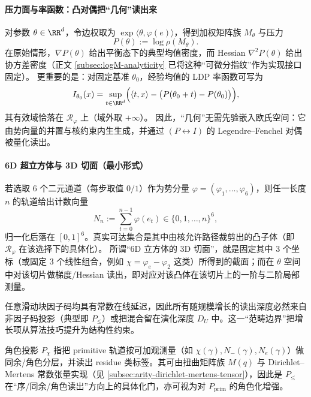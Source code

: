 \paragraph{压力面与率函数：凸对偶把“几何”读出来}
对参数 \(\theta\in\RR^d\)，令边权取为 \(\exp\langle\theta,\varphi(e)\rangle\)，得到加权矩阵族 \(M_\theta\) 与压力
$$
P(\theta):=\log\rho(M_\theta).
$$
在原始情形，\(\nabla P(\theta)\) 给出平衡态下的典型均值密度，而 Hessian \(\nabla^2P(\theta)\) 给出协方差密度（正文 \ref{subsec:logM-analyticity} 已将这种“可微分指纹”作为实现接口固定）。
更重要的是：对固定基准 \(\theta_0\)，经验均值的 LDP 率函数可写为
$$
I_{\theta_0}(x)=\sup_{t\in\RR^d}\Bigl(\langle t,x\rangle-\bigl(P(\theta_0+t)-P(\theta_0)\bigr)\Bigr),
$$
其有效域恰落在 \(\mathcal{R}_\varphi\) 上（域外取 \(+\infty\)）。
因此，“几何”无需先验嵌入欧氏空间：它由势向量的并置与核约束内生生成，并通过 \((P\leftrightarrow I)\) 的 Legendre--Fenchel 对偶被量化读出。

\paragraph{6D 超立方体与 3D 切面（最小形式）}
若选取 \(6\) 个二元通道（每步取值 \(0/1\)）作为势分量 \(\varphi=(\varphi_1,\dots,\varphi_6)\)，则任一长度 \(n\) 的轨道给出计数向量
$$
N_n:=\sum_{t=0}^{n-1}\varphi(e_t)\in\{0,1,\dots,n\}^6,
$$
归一化后落在 \([0,1]^6\)。真实可达集合是其中由核允许路径裁剪出的凸子体（即 \(\mathcal{R}_\varphi\) 在该选择下的具体化）。
所谓“6D 立方体的 3D 切面”，就是固定其中 \(3\) 个坐标（或固定 \(3\) 个线性组合，例如 \(\chi=\varphi_e-\varphi_2\) 这类）所得到的截面；而在 \(\theta\) 空间中对该切片做梯度/Hessian 读出，即对应对该凸体在该切片上的一阶与二阶局部测量。



\begin{remark}[范畴边界与不可并行增长]\label{rem:pom-factor-boundary}
任意滑动块因子码均具有常数在线延迟，因此所有随规模增长的读出深度必然来自非因子码投影（典型即 $P_{\le}$）或把混合留在演化深度 $D_U$ 中。这一“范畴边界”把增长项从算法技巧提升为结构性约束。
\end{remark}

\begin{definition}\label{def:pom-proj-chi}
角色投影 $P_\chi$ 指把 primitive 轨道按可加观测量（如 $\chi(\gamma),N_-(\gamma),N_e(\gamma)$）做同余/角色分层，并读出 residue 类标签。其可由扭曲矩阵族 $M(q)$ 与 Dirichlet--Mertens 常数张量实现（见 \ref{subsec:arity-dirichlet-mertens-tensor}），因此是 $P_{\le}$ 在“序/同余/角色读出”方向上的具体化门，亦可视为对 $P_{\mathrm{prim}}$ 的角色化增强。
\end{definition}

